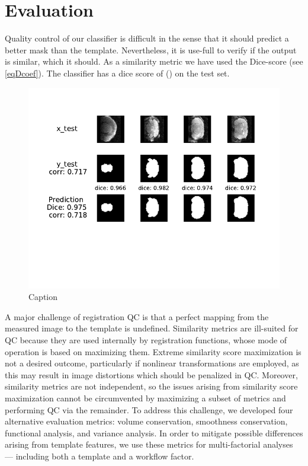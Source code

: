 \section{Evaluation}
Quality control of our classifier is difficult in the sense that it should predict a better mask than the template.
Nevertheless, it is use-full to verify if the output is similar, which it should.
As a similarity metric we have used the Dice-score (see \cref{eqDcoef}).
The classifier has a dice score of () on the test set.

\begin{figure}
    \centering
    \includegraphics{mlebe_figs/sub-6542_ses-ofMaF_acq-TurboRARE_T2w1.pdf}
    \caption{Caption}
    \label{fig:my_label}
\end{figure}





\iffalse
A major challenge of registration QC is that a perfect mapping from the measured image to the template is undefined.
Similarity metrics are ill-suited for QC because they are used internally by registration functions, whose mode of operation is based on maximizing them.
Extreme similarity score maximization is not a desired outcome, particularly if nonlinear transformations are employed, as this may result in image distortions which should be penalized in QC.
Moreover, similarity metrics are not independent, so the issues arising from similarity score maximization cannot be circumvented by maximizing a subset of metrics and performing QC via the remainder.
To address this challenge, we developed four alternative evaluation metrics: volume conservation, smoothness conservation, functional analysis, and variance analysis.
In order to mitigate possible differences arising from template features, we use these metrics for multi-factorial analyses --- including both a template and a workflow factor.


